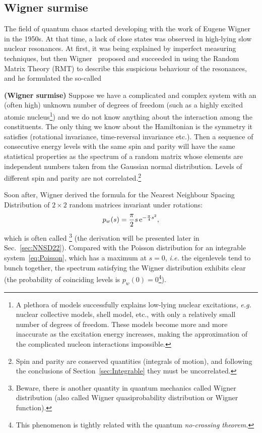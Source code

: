 \documentclass[a4paper,11pt,twoside]{article}
\begin{document}
    \subsection{Wigner surmise}\label{sec:Wigner}
        The field of quantum chaos started developing with the work of Eugene Wigner in the 1950s. 
        At that time, a lack of close states was observed in high-lying slow nuclear resonances.        
        At first, it was being explained by imperfect measuring techniques, but then Wigner~\cite{Wig51,Wig55,Wig57} proposed and succeeded in using the Random Matrix Theory (RMT) to describe this suspicious behaviour of the resonances, and he formulated the so-called
        \begin{theorem}
            {\bf (Wigner surmise)}
            Suppose we have a complicated and complex system with an (often high) unknown number of degrees of freedom (such as a highly excited atomic nucleus\footnote{
                A plethora of models successfully explains low-lying nuclear excitations, \emph{e.g.} nuclear collective models, shell model, etc., with only a relatively small number of degrees of freedom.
                These models become more and more inaccurate as the excitation energy increases, making the approximation of the complicated nucleon interactions impossible.})
            and we do not know anything about the interaction among the constituents.
            The only thing we know about the Hamiltonian is the symmetry it satisfies (rotational invariance, time-reversal invariance etc.).
            Then a sequence of consecutive energy levels with the same spin and parity will have the same statistical properties as the spectrum of a random matrix whose elements are independent numbers taken from the Gaussian normal distribution.
            Levels of different spin and parity are not correlated.\footnote{Spin and parity are conserved quantities (integrals of motion), and following the conclusions of Section~\ref{sec:Integrable} they must be uncorrelated.}
        \end{theorem}
        Soon after, Wigner derived the formula for the Nearest Neighbour Spacing Distribution of $2\times2$ random matrices invariant under rotations:
        \begin{equation}
            \label{eq:Wigner}
            p_{w}(s)=\frac{\pi}{2}s\operatorname{e}^{-\frac{\pi}{4}s^{2}},
        \end{equation}
        which is often called \footnote{Beware, there is another quantity in quantum mechanics called Wigner distribution (also called Wigner quasiprobability distribution or Wigner function).} (the derivation will be presented later in Sec.~\ref{sec:NNSD22}).
        Compared with the Poisson distribution for an integrable system~\eqref{eq:Poisson}, which has a maximum at $s=0$, \emph{i.e.} the eigenlevels tend to bunch together, the spectrum satisfying the Wigner distribution exhibits clear  (the probability of coinciding levels is $p_{w}(0)=0$\footnote{This phenomenon is tightly related with the quantum \emph{no-crossing theorem.}}). 
\end{document}
